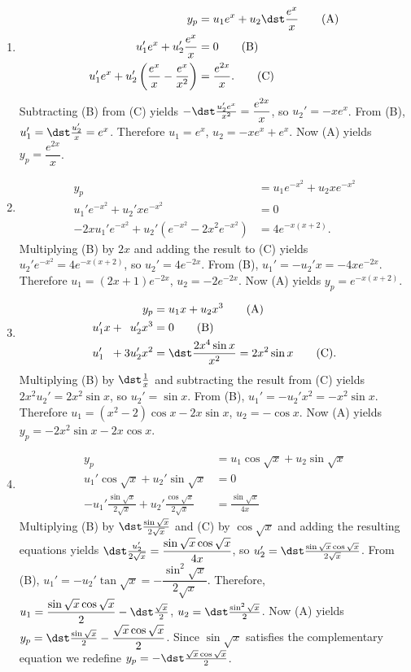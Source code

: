 \documentclass[openany]{book}
\newenvironment{sectionSolutions}{
 \begin{enumerate}[item-label={\thesection.\arabic{enumi}.}]
}{
 \end{enumerate}
}
\begin{document}
\begin{sectionSolutions}
\item
\begin{align*}
y_p&=u_1e^x+u_2\dst\frac{e^x}{ x}\tag{A}\\
u_1'e^x+u_2'\frac{e^x}{ x}&=0\tag{B}\\
u_1'e^x+u_2'\left(\frac{e^x}{ x}-\frac{e^x}{ x^2}\right)&=\frac{e^{2x}}{
x}.\tag{C}
\end{align*}
Subtracting (B) from (C) yields
$-\dst\frac{u_2'e^x}{ x^2}=\dfrac{e^{2x}}{ x}$, so $u_2'=-xe^x$. From
(B), $u_1'=\dst\frac{u_2'}{ x}=e^x$. Therefore
$u_1=e^x$, $u_2=-xe^x+e^x$. Now (A) yields $y_p=\dfrac{e^{2x}}{ x}$.


\item
\begin{align*}
y_p&=u_1e^{-x^2}+u_2xe^{-x^2}\tag{A}\\
u_1'e^{-x^2} +u_2'xe^{-x^2}&=0\tag{B}\\
-2xu_1'e^{-x^2}+u_2'(e^{-x^2}-2x^2e^{-x^2})&=
4e^{-x(x+2)}.\tag{C}
\end{align*}
Multiplying (B) by $2x$ and adding the result to
(C) yields $u_2'e^{-x^2}=4e^{-x(x+2)}$, so
$u_2'=4e^{-2x}$. From (B), $u_1'=-u_2'x=-4xe^{-2x}$.
Therefore $u_1=(2x+1)e^{-2x}$, $u_2=-2e^{-2x}$. Now (A) yields
$y_p=e^{-x(x+2)}$.


\item
\begin{align*}
y_p&=u_1x+u_2x^3\tag{A}\\
u_1'x+\phantom{3}u_2'x^3&=0\tag{B}\\
u_1'\phantom{x}+3u_2'x^2&=\dst\frac{2x^4\sin x}{
x^2}=2x^2\sin x \tag{C}.
\end{align*}
Multiplying (B) by $\dst\frac{1}{ x}$ and subtracting
the result from (C) yields $2x^2u_2'=2x^2\sin x$, so
$u_2'=\sin x$. From (B), $u_1'=-u_2'x^2=-x^2\sin x$.
Therefore $u_1=(x^2-2)\cos x-2x\sin x$, $u_2=-\cos x$. Now (A) yields
$y_p=-2x^2\sin x-2x\cos x$.


\item
\begin{align*}
y_p&=u_1\cos\sqrt x+u_2\sin\sqrt x\tag{A}\\
u_1'\cos\sqrt x+u_2'\sin\sqrt x&=0\tag{B}\\
-u_1'\frac{\sin\sqrt x}{2\sqrt
x}+u_2'\frac{\cos\sqrt x}{2\sqrt x}&=\frac{\sin\sqrt x}{4x}\tag{C}
\end{align*}
Multiplying (B) by $\dst\frac{\sin\sqrt x}{2\sqrt x}$
and (C) by $\cos\sqrt x$ and adding the resulting
equations yields $\dst\frac{u_2'}{2\sqrt x}=\dfrac{\sin\sqrt x\cos\sqrt
x}{4x}$, so $u_2'=\dst\frac{\sin\sqrt x\cos\sqrt x}{2\sqrt x}$. From
(B), $u_1'=-u_2'\tan\sqrt x=-\dfrac{\sin^2\sqrt
x}{2\sqrt x}$. Therefore, $u_1=\dfrac{\sin\sqrt x\cos\sqrt
x}{2}-\dst\frac{\sqrt x}{2}$, $u_2=\dst\frac{\sin^2\sqrt x}{2}$. Now
(A) yields $y_p=\dst\frac{\sin\sqrt x}{2}-\dfrac{\sqrt x\cos\sqrt
x}{2}$. Since $\sin\sqrt x$ satisfies the complementary equation we
redefine $y_p=-\dst\frac{\sqrt x\cos\sqrt x}{2}$.



\end{sectionSolutions}
\end{document}
